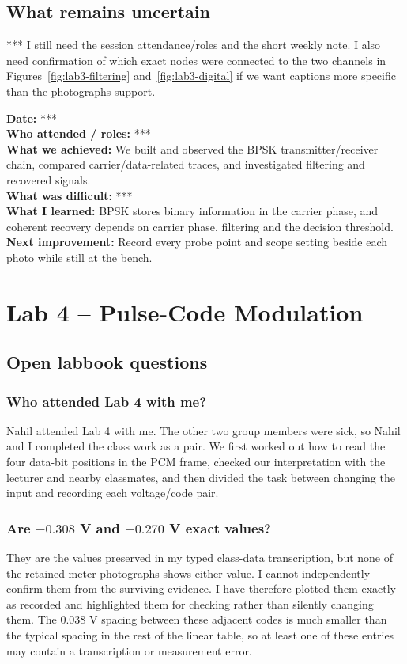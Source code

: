 \documentclass[11pt,a4paper]{article}
\newcommand{\weeklynote}[1]{\begin{notebox}#1\end{notebox}}
\newcommand{\labdivider}{\FloatBarrier\clearpage}
\begin{document}
\subsection{What remains uncertain}
\begin{checkbox}
*** I still need the session attendance/roles and the short weekly note. I also need confirmation of which exact nodes were connected to the two channels in Figures~\ref{fig:lab3-filtering} and~\ref{fig:lab3-digital} if we want captions more specific than the photographs support.
\end{checkbox}
\weeklynote{\textbf{Date:} ***\\\textbf{Who attended / roles:} ***\\\textbf{What we achieved:} We built and observed the BPSK transmitter/receiver chain, compared carrier/data-related traces, and investigated filtering and recovered signals.\\\textbf{What was difficult:} ***\\\textbf{What I learned:} BPSK stores binary information in the carrier phase, and coherent recovery depends on carrier phase, filtering and the decision threshold.\\\textbf{Next improvement:} Record every probe point and scope setting beside each photo while still at the bench.}
\labdivider
\section{Lab 4 -- Pulse-Code Modulation}
\subsection{Open labbook questions}
\subsubsection*{Who attended Lab 4 with me?}
\begin{answerbox}
Nahil attended Lab 4 with me. The other two group members were sick, so Nahil and I completed the class work as a pair. We first worked out how to read the four data-bit positions in the PCM frame, checked our interpretation with the lecturer and nearby classmates, and then divided the task between changing the input and recording each voltage/code pair.
\end{answerbox}

\subsubsection*{Are $-0.308$ V and $-0.270$ V exact values?}
\begin{answerbox}
They are the values preserved in my typed class-data transcription, but none of the retained meter photographs shows either value. I cannot independently confirm them from the surviving evidence. I have therefore plotted them exactly as recorded and highlighted them for checking rather than silently changing them. The $0.038$ V spacing between these adjacent codes is much smaller than the typical spacing in the rest of the linear table, so at least one of these entries may contain a transcription or measurement error.
\end{answerbox}
\end{document}

